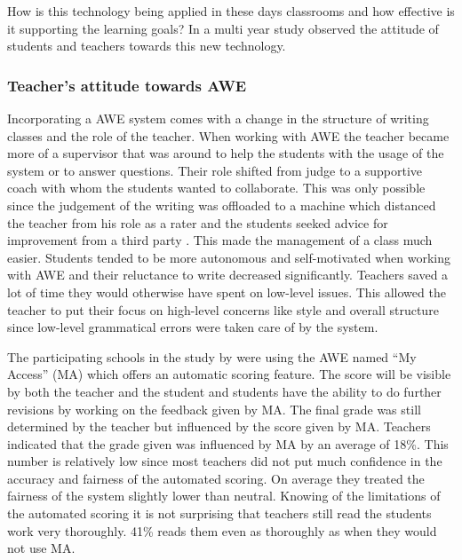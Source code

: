 \documentclass[runningheads]{llncs}
\begin{document}
How is this technology being applied in these days classrooms and how effective is it supporting the learning goals? In a multi year study \textcite{grimes_utility_2010} observed the attitude of students and teachers towards this new technology. 

\subsubsection{Teacher's attitude towards AWE}
Incorporating a AWE system comes with a change in the structure of writing classes and the role of the teacher. When working with AWE the teacher became more of a supervisor that was around to help the students with the usage of the system or to answer questions. Their role shifted from judge to a supportive coach with whom the students wanted to collaborate. This was only possible since the judgement of the writing was offloaded to a machine which distanced the teacher from his role as a rater and the students seeked advice for improvement from a third party \citep{grimes_utility_2010}. This made the management of a class much easier. Students tended to be more autonomous and self-motivated when working with AWE and their reluctance to write decreased significantly. Teachers saved a lot of time they would otherwise have spent on low-level issues. This allowed the teacher to put their focus on high-level concerns like style and overall structure since low-level grammatical errors were taken care of by the system.

The participating schools in the study by \textcite{grimes_utility_2010} were using the AWE named ``My Access'' (MA) which offers an automatic scoring feature. The score will be visible by both the teacher and the student and students have the ability to do further revisions by working on the feedback given by MA. The final grade was still determined by the teacher but influenced by the score given by MA. Teachers indicated that the grade given was influenced by MA by an average of 18\%. This number is relatively low since most teachers did not put much confidence in the accuracy and fairness of the automated scoring. On average they treated the fairness of the system slightly lower than neutral. Knowing of the limitations of the automated scoring it is not surprising that teachers still read the students work very thoroughly. 41\% reads them even as thoroughly as when they would not use MA. 
\end{document}
